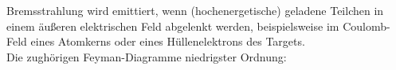 \FloatBarrier
Bremsstrahlung wird emittiert, wenn (hochenergetische) geladene Teilchen in einem äußeren
elektrischen Feld abgelenkt werden, beispielsweise im Coulomb-Feld eines Atomkerns oder eines
Hüllenelektrons des Targets.
\\
Die zughörigen Feyman-Diagramme niedrigster Ordnung:
\\
\\

\begin{figure}[H]
	\begin{minipage}[b]{0.5\textwidth}
		\begin{figure}[H]
		\centering
		
		\end{figure}
	\end{minipage}
	\hspace{5mm} 
	\begin{minipage}[b]{0.5\textwidth}
		\begin{figure}[H]
		\centering
		
		\vspace{3mm}
		\end{figure} 
	\end{minipage} 
\end{figure}








